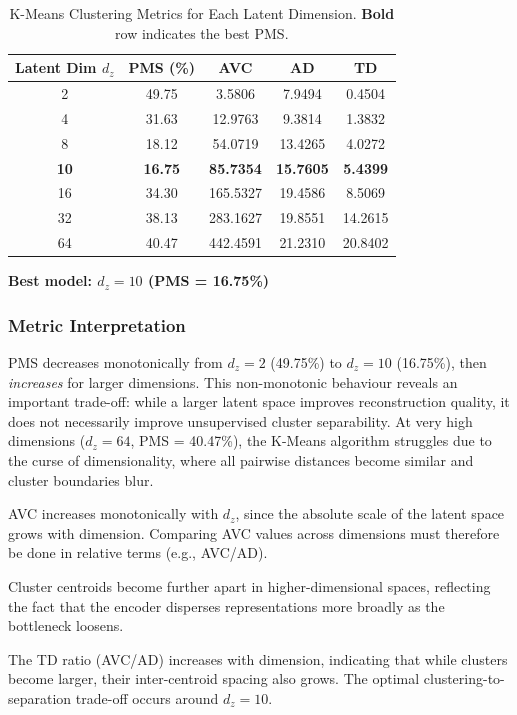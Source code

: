 \documentclass[12pt,a4paper]{article}
\begin{document}
\begin{table}[H]
  \centering
  \caption{K-Means Clustering Metrics for Each Latent Dimension. \textbf{Bold} row indicates the best PMS.}
  \label{tab:metrics}
  \renewcommand{\arraystretch}{1.4}
  \begin{tabular}{ccccc}
    \toprule
    \textbf{Latent Dim} $d_z$ & \textbf{PMS (\%)} & \textbf{AVC} & \textbf{AD} & \textbf{TD} \\
    \midrule
    2  & 49.75 & 3.5806    & 7.9494  & 0.4504  \\
    4  & 31.63 & 12.9763   & 9.3814  & 1.3832  \\
    8  & 18.12 & 54.0719   & 13.4265 & 4.0272  \\
    \textbf{10} & \textbf{16.75} & \textbf{85.7354} & \textbf{15.7605} & \textbf{5.4399} \\
    16 & 34.30 & 165.5327  & 19.4586 & 8.5069  \\
    32 & 38.13 & 283.1627  & 19.8551 & 14.2615 \\
    64 & 40.47 & 442.4591  & 21.2310 & 20.8402 \\
    \bottomrule
  \end{tabular}
\end{table}

\noindent\textbf{Best model: $d_z = 10$ (PMS = 16.75\%)}

\subsubsection*{Metric Interpretation}

\begin{description}[leftmargin=2em]
  \item[PMS trend:] PMS decreases monotonically from $d_z = 2$ (49.75\%) to $d_z = 10$ (16.75\%), then \emph{increases} for larger dimensions. This non-monotonic behaviour reveals an important trade-off: while a larger latent space improves reconstruction quality, it does not necessarily improve unsupervised cluster separability. At very high dimensions ($d_z = 64$, PMS = 40.47\%), the K-Means algorithm struggles due to the curse of dimensionality, where all pairwise distances become similar and cluster boundaries blur.

  \item[AVC trend:] AVC increases monotonically with $d_z$, since the absolute scale of the latent space grows with dimension. Comparing AVC values across dimensions must therefore be done in relative terms (e.g., AVC/AD).

  \item[AD trend:] Cluster centroids become further apart in higher-dimensional spaces, reflecting the fact that the encoder disperses representations more broadly as the bottleneck loosens.

  \item[TD trend:] The TD ratio (AVC/AD) increases with dimension, indicating that while clusters become larger, their inter-centroid spacing also grows. The optimal clustering-to-separation trade-off occurs around $d_z = 10$.
\end{description}
\end{document}
